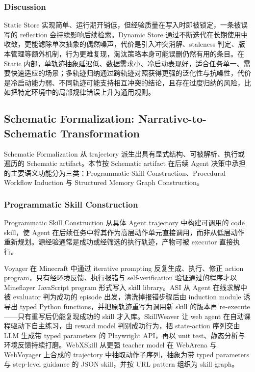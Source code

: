 

\subsubsection{Discussion}

Static Store 实现简单、运行期开销低，但经验质量在写入时即被锁定，一条被误写的 reflection 会持续影响后续检索。Dynamic Store 通过不断迭代在长期使用中收敛，更能滤除单次抽象的偶然噪声，代价是引入冲突消解、staleness 判定、版本管理等额外机制，行为更难复现，淘汰策略本身可能误删仍然有用的条目。在 Static 内部，单轨迹抽象延迟低、数据需求小、冷启动表现好，适合任务单一、需要快速适应的场景；多轨迹归纳通过跨轨迹对照获得更强的泛化性与抗噪性，代价是冷启动能力弱、不同轨迹可能支持相互冲突的结论，且存在过度归纳的风险，比如把特定环境中的局部规律错误上升为通用规则。

\subsection{Schematic Formalization: Narrative-to-Schematic Transformation}

Schematic Formalization 从 trajectory 派生出具有显式结构、可被解析、执行或遍历的 Schematic artifact。本节按 Schematic artifact 在后续 Agent 决策中承担的主要语义功能分为三类：Programmatic Skill Construction、Procedural Workflow Induction 与 Structured Memory Graph Construction。

\subsubsection{Programmatic Skill Construction}

Programmatic Skill Construction 从具体 Agent trajectory 中构建可调用的 code skill，使 Agent 在后续任务中将其作为高层动作单元直接调用，而非从低层动作重新规划。源经验通常是成功或经筛选的执行轨迹，产物可被 executor 直接执行。

Voyager \cite{Wan23c} 在 Minecraft 中通过 iterative prompting 反复生成、执行、修正 action program，只有经环境反馈、执行报错与 self-verification 验证通过的程序才以 Mineflayer JavaScript program 形式写入 skill library。ASI \cite{Wan25d} 从 Agent 在线求解中被 evaluator 判为成功的 episode 出发，清洗掉报错步骤后由 induction module 诱导出 typed Python functions，并把原轨迹重写为调用新 skill 的版本再 re-execute——只有重写后仍能复现成功的 skill 才入库。SkillWeaver \cite{Zhe25c} 让 web agent 在自动课程驱动下自主练习，由 reward model 判别成功行为，把 state-action 序列交由 LLM 生成带 typed parameters 的 Playwright API，再以 unit test、静态分析与环境反馈持续打磨。WebXSkill \cite{Wan26d} 从更强 teacher model 在 WebArena 与 WebVoyager 上合成的 trajectory 中抽取动作子序列，抽象为带 typed parameters 与 step-level guidance 的 JSON skill，并按 URL pattern 组织为 skill graph。

